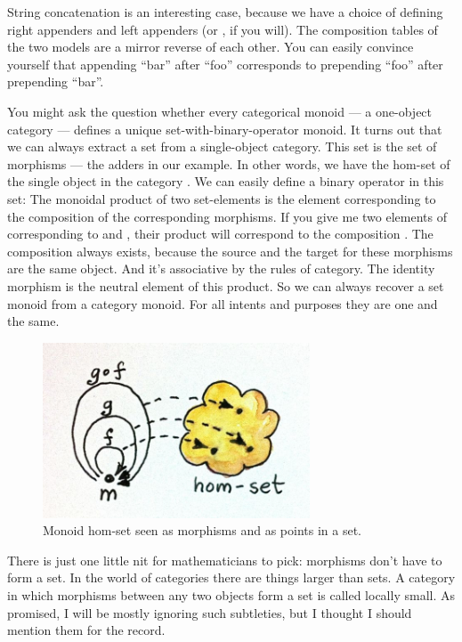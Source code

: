 String concatenation is an interesting case, because we have a choice of
defining right appenders and left appenders (or , if
you will). The composition tables of the two models are a mirror reverse
of each other. You can easily convince yourself that appending ``bar''
after ``foo'' corresponds to prepending ``foo'' after prepending
``bar''.

You might ask the question whether every categorical monoid --- a
one-object category --- defines a unique set-with-binary-operator
monoid. It turns out that we can always extract a set from a
single-object category. This set is the set of morphisms --- the adders
in our example. In other words, we have the hom-set  of the
single object  in the category . We can easily define a binary
operator in this set: The monoidal product of two set-elements is the
element corresponding to the composition of the corresponding morphisms.
If you give me two elements of  corresponding to  and
, their product will correspond to the composition
. The composition always exists, because the source and the
target for these morphisms are the same object. And it's associative by
the rules of category. The identity morphism is the neutral element of
this product. So we can always recover a set monoid from a category
monoid. For all intents and purposes they are one and the same.

\begin{figure}
\centering
\includegraphics[width=3.12500in]{images/monoidhomset.jpg}
\captionsetup{labelformat=empty,font=scriptsize}
\caption{Monoid hom-set seen as morphisms and as points in a set.}
\end{figure}

There is just one little nit for mathematicians to pick: morphisms don't
have to form a set. In the world of categories there are things larger
than sets. A category in which morphisms between any two objects form a
set is called locally small. As promised, I will be mostly ignoring such
subtleties, but I thought I should mention them for the record.

